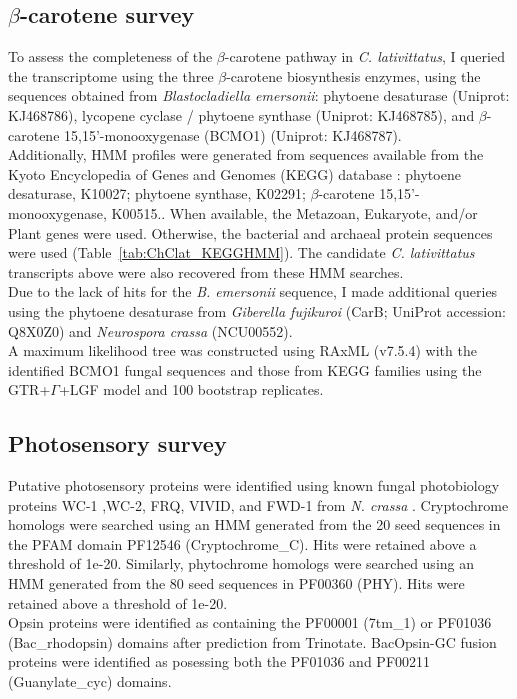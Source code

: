 \subsection*{$\beta$-carotene survey}
To assess the completeness of the $\beta$-carotene pathway in \textit{C. lativittatus}, I queried the transcriptome using the three $\beta$-carotene biosynthesis enzymes, using the sequences obtained from \textit{Blastocladiella emersonii}: phytoene desaturase (Uniprot: KJ468786), lycopene cyclase / phytoene synthase (Uniprot: KJ468785), and $\beta$-carotene 15,15'-monooxygenase (BCMO1) (Uniprot: KJ468787).\\
\indent Additionally, HMM profiles were generated from sequences available from the Kyoto Encyclopedia of Genes and Genomes (KEGG) database \cite{Kanehisa2000,Kanehisa2014}: phytoene desaturase, K10027; phytoene synthase, K02291; $\beta$-carotene 15,15'-monooxygenase, K00515.. When available, the Metazoan, Eukaryote, and/or Plant genes were used. Otherwise, the bacterial and archaeal protein sequences were used (Table~\ref{tab:ChClat_KEGGHMM}). The candidate \textit{C. lativittatus} transcripts above were also recovered from these HMM searches. \\
\indent Due to the lack of hits for the \textit{B. emersonii} sequence, I made additional queries using the phytoene desaturase from \textit{Giberella fujikuroi} (CarB; UniProt accession: Q8X0Z0) and \textit{Neurospora crassa} (NCU00552). \\
\indent A maximum likelihood tree was constructed using RAxML (v7.5.4) with the identified BCMO1 fungal sequences and those from KEGG families using the GTR+$\Gamma$+LGF model and 100 bootstrap replicates. \\

\subsection*{Photosensory survey}
Putative photosensory proteins were identified using known fungal photobiology proteins WC-1 ,WC-2, FRQ, VIVID, and FWD-1 from \textit{N. crassa} \cite{Borkovich2004}. Cryptochrome homologs were searched using an HMM generated from the 20 seed sequences in the PFAM domain PF12546 (Cryptochrome\_C). Hits were retained above a threshold of 1e-20. Similarly, phytochrome homologs were searched using an HMM generated from the 80 seed sequences in PF00360 (PHY). Hits were retained above a threshold of 1e-20. \\
\indent Opsin proteins were identified as containing the PF00001 (7tm\_1) or PF01036 (Bac\_rhodopsin) domains after prediction from Trinotate. BacOpsin-GC fusion proteins were identified as posessing both the PF01036 and PF00211 (Guanylate\_cyc) domains.\\

